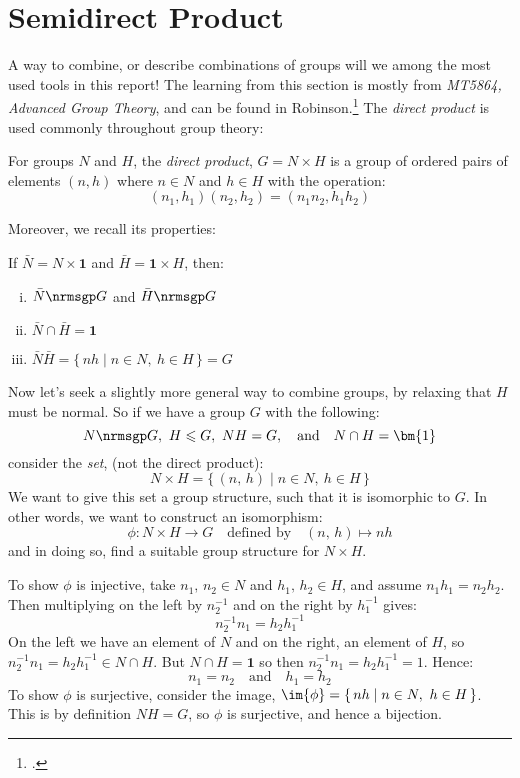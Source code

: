 \section{Semidirect Product}
A way to combine, or describe combinations of groups will we among the most used tools in this report!
The learning from this section is mostly from \textit{MT5864, Advanced Group Theory}, and can be found in
Robinson.\footcite{robinson1982}
The \emph{direct product} is used commonly throughout group theory:
\begin{definition}
    \raggedright
    For groups \(N\) and \(H\), the \emph{direct product}, \(G = N\times H\) is a group of ordered pairs of elements
    \((n, h)\) where \(n \in N\) and \(h \in H\) with the operation:
    \[(n_1, h_1)(n_2, h_2) = (n_1n_2, h_1h_2)\]
\end{definition}

Moreover, we recall its properties:
\begin{lemma}
    If \(\bar{N} = N \times \bm{1}\) and \(\bar{H} = \bm{1} \times H\), then:
    \begin{enumerate}[(i)]
        \item \(\bar{N} \nrmsgp G\) and \(\bar{H} \nrmsgp G\)
        \item \(\bar{N} \cap \bar{H} = \bm{1}\)
        \item \(\bar{N}\bar{H} = \{\,nh \mid n \in N,\ h \in H\,\} = G\)
    \end{enumerate}
\end{lemma}

Now let's seek a slightly more general way to combine groups, by relaxing that \(H\) must be normal.
So if we have a group \(G\) with the following:
\[N \nrmsgp G,\ H \leqslant G,\ NH = G, \quad \text{and} \quad N \cap H = \bm{1}\]
consider the \emph{set}, (not the direct product):
\[N \times H = \{\,(n,\,h) \mid n \in N,\ h \in H\,\}\]
We want to give this set a group structure, such that it is isomorphic to \(G\).
In other words, we want to construct an isomorphism:
\[\phi:N \times H \to G \quad \text{defined by} \quad (n,\, h) \mapsto nh\]
and in doing so, find a suitable group structure for \(N {\times} H\).

To show \(\phi\) is injective, take \(n_1,\, n_2 \in N\) and \(h_1,\, h_2 \in H\), and assume \(n_1 h_1 = n_2 h_2\).
Then multiplying on the left by \(n_2^{-1}\) and on the right by \(h_1^{-1}\) gives:
\[n_2^{-1} n_1 = h_2 h_1^{-1}\]
On the left we have an element of \(N\) and on the right, an element of \(H\), so \(n_2^{-1} n_1 = h_2 h_1^{-1} \in N
\cap H\).
But \(N \cap H = \bm{1}\) so then \(n_2^{-1} n_1 = h_2 h_1^{-1} = 1\).
Hence:
\[n_1 = n_2 \quad \text{and} \quad h_1 = h_2\]
To show \(\phi\) is surjective, consider the image, \(\im{\phi} = \{\,nh \mid n \in N,\ h \in H\,\}\).
This is by definition \(NH = G\), so \(\phi\) is surjective, and hence a bijection.

